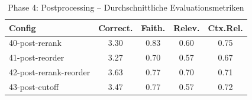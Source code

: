 \begin{table}[H]
\centering
\small
\begin{tabular}{lcccc}
\toprule
Config & Correct. & Faith. & Relev. & Ctx.Rel. \\
\midrule
40-post-rerank & 3.30 & 0.83 & 0.60 & 0.75 \\
41-post-reorder & 3.27 & 0.70 & 0.57 & 0.67 \\
42-post-rerank-reorder & 3.63 & 0.77 & 0.70 & 0.71 \\
43-post-cutoff & 3.47 & 0.77 & 0.57 & 0.72 \\
\bottomrule
\end{tabular}
\caption{Phase 4: Postprocessing -- Durchschnittliche Evaluationsmetriken}
\label{tab:phase4_eval}
\end{table}